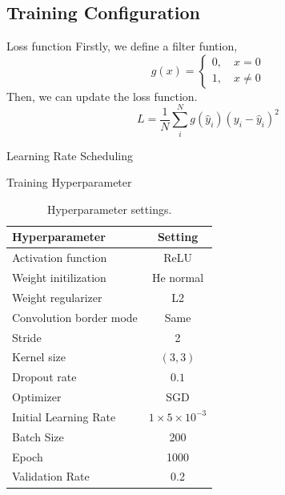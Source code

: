 \documentclass{beamer}
\begin{document}
\subsection{Training Configuration}
\begin{frame}{Loss function}
Firstly, we define a filter funtion,
\begin{equation}
            g(x)= \begin{cases} 0, \quad x = 0 \\ 1, \quad x \ne 0 \end{cases}
        \end{equation}
        Then, we can update the loss function.
        \begin{equation}
            L = \frac{1}{N}\sum_{i}^{N}g(\hat{y}_i)(y_i-\hat{y}_i)^2
        \end{equation}
\end{frame}
\begin{frame}{Learning Rate Scheduling}
\begin{algorithm}[H]
        \caption{Learning Rate Scheduling}
        \label{ls}
    \end{algorithm}
\end{frame}
\begin{frame}{Training Hyperparameter}
\begin{table}[h!]
        \centering
        \begin{tabular}{ l | c  }
            Hyperparameter  & Setting \\ \hline
            Activation function & ReLU \\
            Weight initilization & He normal \\
            Weight regularizer &  L2 \\
            Convolution border mode  & Same \\
            Stride & 2 \\ 
            Kernel size & $(3, 3)$ \\
            Dropout rate & $0.1$ \\
            Optimizer & SGD \\
            Initial Learning Rate & $1\times 5\times10^{-3}$ \\
            Batch Size & 200 \\
            Epoch & 1000 \\
            Validation Rate & 0.2 \\
        \end{tabular}
        \caption{Hyperparameter settings.}
        \label{table:hyper}
\end{table}
\end{frame}
\end{document}
